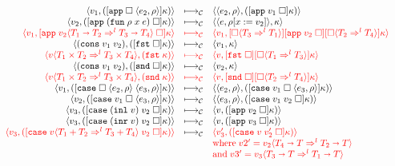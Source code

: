 \documentclass[acmsmall,review,anonymous]{acmart}\settopmatter{printfolios=true,printccs=false,printacmref=false}
\newcommand{\plus}[0]{+}
\newcommand{\sOOinspect}[3]{\langle\langle#1,#2\rangle,#3\rangle}
\newcommand{\sOOreturn}[2]{\langle#1,#2\rangle}
\newcommand{\POOfun}[2]{#1 \shortrightarrow #2}
\newcommand{\POOprod}[2]{#1 \times #2}
\newcommand{\POOsum}[2]{#1 \plus #2}
\newcommand{\cOOcast}[3]{#1 \Rightarrow^{#2} #3}
\newcommand{\vOOcast}[2]{#1\langle#2\rangle}
\newcommand{\vOOfun}[3]{\mathtt{fun} \; #1 \; #2 \; #3}
\newcommand{\vOOcons}[2]{\mathtt{cons}\;#1\;#2}
\newcommand{\vOOinl}[1]{\mathtt{inl}\;#1}
\newcommand{\vOOinr}[1]{\mathtt{inr}\;#1}
\newcommand{\kOOappI}[3]{
	[\mathtt{app} \; \square \; \langle#1,#2\rangle ]#3
}
\newcommand{\kOOappII}[2]{
	[\mathtt{app} \; #1 \; \square]#2}
\newcommand{\kOOcar}[1]{[\mathtt{fst} \; \square]#1}
\newcommand{\kOOcdr}[1]{[\mathtt{snd} \; \square]#1}
\newcommand{\kOOcaseI}[4]{
	[\mathtt{case} \; \square \; \langle#1,#3\rangle \; \langle#2,#3\rangle ]#4}
\newcommand{\kOOcaseII}[4]{
	[\mathtt{case} \; #1 \; \square \; \langle#2,#3\rangle ]#4}
\newcommand{\kOOcaseIII}[3]{
	[\mathtt{case} \; #1 \; #2 \; \square]#3}
\newcommand{\kOOcast}[2]{
	[\square \langle #1 \rangle]#2}
\newcommand{\redrule}[3]{#1 & \longmapsto_\mathcal{C} & #2 & #3\\}
\newcommand{\hiredrule}[3]{\highlight{#1} & \highlight{\longmapsto_\mathcal{C}} & \highlight{#2} & \highlight{#3} \\}
\newcommand{\highlight}[1]{{\color{red} #1}}
\begin{document}
\begin{figure}
\[\begin{array}{rclr}
\redrule{
\sOOreturn{v_1}{(\kOOappI{e_2}{\rho}{\kappa})}}{
\sOOinspect{e_2}{\rho}{(\kOOappII{v_1}{\kappa})}}{}

\redrule{
\sOOreturn{v_2}{(\kOOappII{(\vOOfun{\rho}{x}{e})}{\kappa})}}{
\sOOinspect{e}{\rho[x:=v_2]}{\kappa}}{}
	\hiredrule{
		\sOOreturn{v_1}{
			\kOOappII{\vOOcast{v_2}{
					\cOOcast{\POOfun{T_1}{T_2}}{l}{\POOfun{T_3}{T_4}}
			}}{\kappa}
		}
	}{
		\sOOreturn{v_1}{
			\kOOcast{\cOOcast{T_3}{l}{T_1}}{
				\kOOappII{v_2}{
					\kOOcast{\cOOcast{T_2}{l}{T_4}}{\kappa}
				}
			}
		}
	}{}
	\redrule{
	\sOOreturn{
		(\vOOcons{v_1}{v_2})
	}{(\kOOcar{\kappa})}
	}{
	\sOOreturn{v_1}{\kappa}
	}{}
	\hiredrule{
		\sOOreturn{
			\vOOcast{v}{\cOOcast{\POOprod{T_1}{T_2}}{l}{
					\POOprod{T_3}{T_4}}}
		}{(\mathtt{fst} \; \kappa)}
	}{
		\sOOreturn{v}{
			\kOOcar{
				\kOOcast{\cOOcast{T_1}{l}{T_3}}{\kappa}
			}}
	}{}
	\redrule{
	\sOOreturn{
		(\vOOcons{v_1}{v_2})
	}{(\kOOcdr{\kappa})}
	}{
	\sOOreturn{v_2}{\kappa}
	}{}
	
	\hiredrule{
		\sOOreturn{
			\vOOcast{v}{\cOOcast{\POOprod{T_1}{T_2}}{l}{
					\POOprod{T_3}{T_4}}}
		}{(\mathtt{snd} \; \kappa)}
	}{
		\sOOreturn{v}{
			\kOOcdr{\kOOcast{\cOOcast{T_2}{l}{T_4}}{\kappa}}}
	}{}

\redrule{
\sOOreturn{v_1}{(\kOOcaseI{e_2}{e_3}{\rho}{\kappa})}}{
\sOOinspect{e_2}{\rho}{(\kOOcaseII{v_1}{e_3}{\rho}{\kappa})}}{}

\redrule{
\sOOreturn{v_2}{(\kOOcaseII{v_1}{e_3}{\rho}{\kappa})}}{
\sOOinspect{e_3}{\rho}{
	(\kOOcaseIII{v_1}{v_2}{\kappa})
}}{}	

\redrule{
\sOOreturn{v_3}{
	(\kOOcaseIII{(\vOOinl{v})}{v_2}{\kappa})
}
}{
\sOOreturn{v}{(\kOOappII{v_2}{\kappa})}
}{}

\redrule{
	\sOOreturn{v_3}{
		(\kOOcaseIII{(\vOOinr{v})}{v_2}{\kappa})
	}
}{
\sOOreturn{v}{(\kOOappII{v_3}{\kappa})}
}{}

\redrule{
	\highlight{\sOOreturn{v_3}{
		(	\kOOcaseIII{
				\vOOcast{v}{\cOOcast{\POOsum{T_1}{T_2}}{l}{\POOsum{T_3}{T_4}}}
			}{v_2}{\kappa})
%		
	}}
}{
	\highlight{\sOOreturn{v_3'}{
			(\kOOcaseIII{v}{v_2'}{\kappa})
	}}
}{\\&&
\highlight{\text{where}\;
v2' = \vOOcast{v_2}{\cOOcast{\POOfun{T_4}{T}}{l}{\POOfun{T_2}{T}}}}
\\&&
\highlight{\text{and}\;
v3' = \vOOcast{v_3}{\cOOcast{\POOfun{T_3}{T}}{l}{\POOfun{T_1}{T}}}}
}
	

\end{array}\]
\end{figure}
\end{document}
